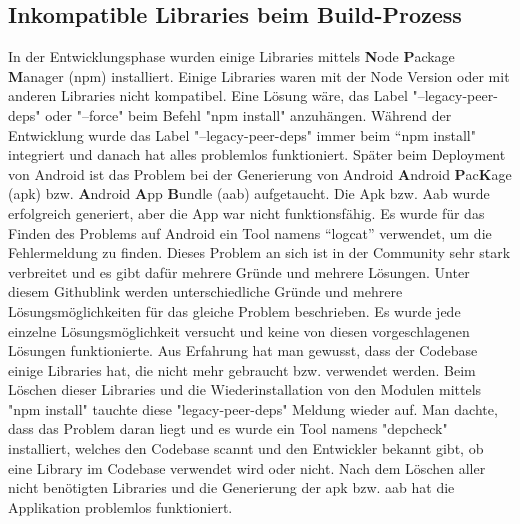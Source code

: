 \begin{spacing}{1}
    \section{Inkompatible Libraries beim Build-Prozess}\label{sec:inkompatible-libraries-beim-build-prozess}
    In der Entwicklungsphase wurden einige Libraries mittels \textbf{N}ode  \textbf{P}ackage \textbf{M}anager (npm) installiert.
    Einige Libraries waren mit der Node Version oder mit anderen Libraries nicht kompatibel.
    Eine Lösung wäre, das Label "--legacy-peer-deps" oder "--force" beim Befehl "npm install" anzuhängen.
    Während der Entwicklung wurde das Label "--legacy-peer-deps" immer beim “npm install" integriert
    und danach hat alles problemlos funktioniert.
    Später beim Deployment von Android ist das Problem
    bei der Generierung von Android \textbf{A}ndroid \textbf{P}ac\textbf{K}age (apk) bzw.
    \textbf{A}ndroid \textbf{A}pp \textbf{B}undle (aab) aufgetaucht.
    Die Apk bzw.
    Aab wurde erfolgreich generiert, aber die App war nicht funktionsfähig.
    Es wurde für das Finden des Problems auf Android ein Tool namens “logcat” verwendet,
    um die Fehlermeldung zu finden.
    Dieses Problem an sich ist in der Community sehr stark verbreitet und es gibt dafür mehrere Gründe und mehrere Lösungen.
    Unter diesem Githublink \cite{libjsexecutor} werden unterschiedliche Gründe und mehrere
    Lösungsmöglichkeiten für das gleiche Problem beschrieben.
    Es wurde jede einzelne Lösungsmöglichkeit versucht und keine von diesen vorgeschlagenen Lösungen
    funktionierte.
    Aus Erfahrung hat man gewusst, dass der Codebase einige Libraries hat,
    die nicht mehr gebraucht bzw.
    verwendet werden. Beim Löschen dieser Libraries und die Wiederinstallation
    von den Modulen mittels "npm install" tauchte diese "legacy-peer-deps" Meldung wieder auf.
    Man dachte, dass das Problem daran liegt und es wurde  ein Tool namens "depcheck" installiert,
    welches den Codebase scannt und den Entwickler bekannt gibt, ob eine Library im Codebase verwendet
    wird oder nicht. \cite{depcheck}
    Nach dem Löschen aller nicht benötigten Libraries und die Generierung der
    apk bzw.
    aab hat die Applikation problemlos funktioniert.




\end{spacing}
